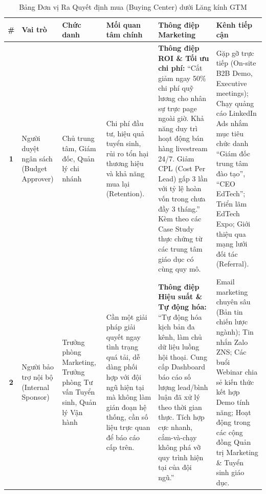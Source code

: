 \begin{table}[H]
    \centering
    \footnotesize
    \setlength{\tabcolsep}{3pt}
    \renewcommand{\arraystretch}{1.25}
    \caption{Bảng Đơn vị Ra Quyết định mua (Buying Center) dưới Lăng kính GTM}
    \label{tab:buying_center_gtm}
    \begin{tabularx}{\linewidth}{@{} c L{2.2cm} L{2.5cm} L{3cm} Y L{2.8cm} @{}}
        \toprule
        \textbf{\#} &
        \textbf{Vai trò} &
        \textbf{Chức danh} &
        \textbf{Mối quan tâm chính} &
        \textbf{Thông điệp Marketing} &
        \textbf{Kênh tiếp cận} \\ \midrule

        \textbf{1} &
        Người duyệt ngân sách (Budget Approver) &
        Chủ trung tâm, Giám đốc, Quản lý chi nhánh &
        Chi phí đầu tư, hiệu quả tuyển sinh, rủi ro tổn hại thương hiệu và khả năng mua lại (Retention). &
        \textbf{Thông điệp ROI \& Tối ưu chi phí:} ``Cắt giảm ngay 50\% chi phí quỹ lương cho nhân sự trực page ngoài giờ. Khả năng duy trì hoạt động bán hàng livestream 24/7. Giảm CPL (Cost Per Lead) gấp 3 lần với tỷ lệ hoàn vốn trong chưa đầy 3 tháng.'' Kèm theo các Case Study thực chứng từ các trung tâm giáo dục có cùng quy mô. &
        Gặp gỡ trực tiếp (On-site B2B Demo, Executive meetings); Chạy quảng cáo LinkedIn Ads nhắm mục tiêu chức danh ``Giám đốc trung tâm đào tạo'', ``CEO EdTech''; Triển lãm EdTech Expo; Giới thiệu qua mạng lưới đối tác (Referral). \\ \midrule

        \textbf{2} &
        Người bảo trợ nội bộ (Internal Sponsor) &
        Trưởng phòng Marketing, Trưởng phòng Tư vấn Tuyển sinh, Quản lý Vận hành &
        Cần một giải pháp giải quyết ngay tình trạng quá tải, dễ dàng phối hợp với đội ngũ hiện tại mà không làm gián đoạn hệ thống, cần số liệu trực quan để báo cáo cấp trên. &
        \textbf{Thông điệp Hiệu suất \& Tự động hóa:} ``Tự động hóa kịch bản đa kênh, làm chủ dữ liệu luồng hội thoại. Cung cấp Dashboard báo cáo số lượng lead/bình luận đã xử lý theo thời gian thực. Tích hợp cực nhanh, cắm-và-chạy không phá vỡ quy trình hiện tại của đội ngũ.'' &
        Email marketing chuyên sâu (Bản tin chiến lược ngành); Tin nhắn Zalo ZNS; Các buổi Webinar chia sẻ kiến thức kết hợp Demo tính năng; Hoạt động trong các cộng đồng Quản trị Marketing \& Tuyển sinh giáo dục. \\ \midrule


\end{tabularx}
\end{table}
